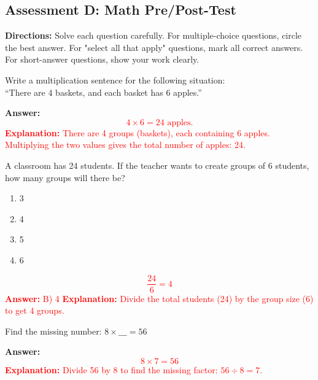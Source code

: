 \documentclass[12pt]{article}
\begin{document}
\subsection*{Assessment D: Math Pre/Post-Test}
\onehalfspacing

\begin{tcolorbox}[colframe=black!50, colback=white, title=Assessment Directions]
\textbf{Directions:} Solve each question carefully. For multiple-choice questions, circle the best answer. For "select all that apply" questions, mark all correct answers. For short-answer questions, show your work clearly.
\end{tcolorbox}

\begin{tcolorbox}[colframe=black!50, colback=white, title=\textbf{Problem 1}]
Write a multiplication sentence for the following situation: \\
``There are 4 baskets, and each basket has 6 apples.''  

\vspace{1cm}
\textbf{Answer:}  
\textcolor{red}{\[
4 \times 6 = 24 \text{ apples.}
\]}  
\textcolor{red}{\textbf{Explanation:} There are 4 groups (baskets), each containing 6 apples. Multiplying the two values gives the total number of apples: 24.}
\end{tcolorbox}

\begin{tcolorbox}[colframe=black!50, colback=white, title=\textbf{Problem 2}]
A classroom has 24 students. If the teacher wants to create groups of 6 students, how many groups will there be?  

\begin{enumerate}[label=(\Alph*)]
    \item 3
    \item 4
    \item 5
    \item 6
\end{enumerate}

\textcolor{red}{\[
\frac{24}{6} = 4
\]}  
\textcolor{red}{\textbf{Answer:} B) 4}  
\textcolor{red}{\textbf{Explanation:} Divide the total students (24) by the group size (6) to get 4 groups.}
\end{tcolorbox}

\begin{tcolorbox}[colframe=black!50, colback=white, title=\textbf{Problem 3}]
Find the missing number:  
\(8 \times \_\_\_ = 56\)  

\vspace{1cm}
\textbf{Answer:}  
\textcolor{red}{\[
8 \times 7 = 56
\]}  
\textcolor{red}{\textbf{Explanation:} Divide 56 by 8 to find the missing factor: \(56 \div 8 = 7\).}
\end{tcolorbox}
\end{document}
